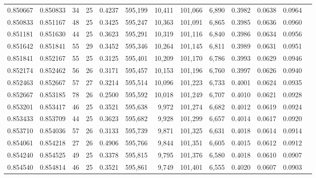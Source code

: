 \begin{tabular}{rrrrrrrrrrrrr}
0.850667 & 0.850833 &    34 &  25 &                                     0.4237 & 595,199 &  10,411 & 101,066 &   6,890 & 0.3982 & 0.0638 & 0.0964 \\
0.850833 & 0.851167 &    48 &  25 &                                     0.3425 & 595,247 &  10,363 & 101,091 &   6,865 & 0.3985 & 0.0636 & 0.0960 \\
0.851181 & 0.851630 &    44 &  25 &                                     0.3623 & 595,291 &  10,319 & 101,116 &   6,840 & 0.3986 & 0.0634 & 0.0956 \\
0.851642 & 0.851841 &    55 &  29 &                                     0.3452 & 595,346 &  10,264 & 101,145 &   6,811 & 0.3989 & 0.0631 & 0.0951 \\
0.851841 & 0.852167 &    55 &  25 &                                     0.3125 & 595,401 &  10,209 & 101,170 &   6,786 & 0.3993 & 0.0629 & 0.0946 \\
0.852174 & 0.852462 &    56 &  26 &                                     0.3171 & 595,457 &  10,153 & 101,196 &   6,760 & 0.3997 & 0.0626 & 0.0940 \\
0.852463 & 0.852667 &    57 &  27 &                                     0.3214 & 595,514 &  10,096 & 101,223 &   6,733 & 0.4001 & 0.0624 & 0.0935 \\
0.852667 & 0.853185 &    78 &  26 &                                     0.2500 & 595,592 &  10,018 & 101,249 &   6,707 & 0.4010 & 0.0621 & 0.0928 \\
0.853201 & 0.853417 &    46 &  25 &                                     0.3521 & 595,638 &   9,972 & 101,274 &   6,682 & 0.4012 & 0.0619 & 0.0924 \\
0.853433 & 0.853709 &    44 &  25 &                                     0.3623 & 595,682 &   9,928 & 101,299 &   6,657 & 0.4014 & 0.0617 & 0.0920 \\
0.853710 & 0.854036 &    57 &  26 &                                     0.3133 & 595,739 &   9,871 & 101,325 &   6,631 & 0.4018 & 0.0614 & 0.0914 \\
0.854061 & 0.854218 &    27 &  26 &                                     0.4906 & 595,766 &   9,844 & 101,351 &   6,605 & 0.4015 & 0.0612 & 0.0912 \\
0.854240 & 0.854525 &    49 &  25 &                                     0.3378 & 595,815 &   9,795 & 101,376 &   6,580 & 0.4018 & 0.0610 & 0.0907 \\
0.854540 & 0.854814 &    46 &  25 &                                     0.3521 & 595,861 &   9,749 & 101,401 &   6,555 & 0.4020 & 0.0607 & 0.0903 \\

\end{tabular}
